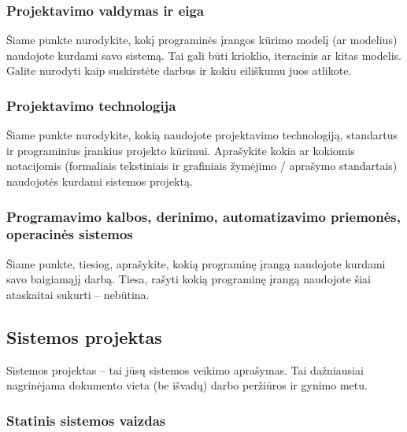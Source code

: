 \documentclass{ktuthesis}
\begin{document}
	\subsubsection{Projektavimo valdymas ir eiga}
	
	Šiame punkte nurodykite, kokį programinės įrangos kūrimo modelį (ar modelius) naudojote kurdami savo sistemą. Tai gali būti krioklio, iteracinis ar kitas modelis.
	Galite nurodyti kaip suskirstėte darbus ir kokiu eiliškumu juos atlikote.
	
	\subsubsection{Projektavimo technologija}
	
	Šiame punkte nurodykite, kokią naudojote projektavimo technologiją, standartus ir programinius įrankius projekto kūrimui. Aprašykite kokia ar kokiomis notacijomis
	(formaliais tekstiniais ir grafiniais žymėjimo / aprašymo standartais) naudojotės kurdami sistemos projektą.
	
	\subsubsection{Programavimo kalbos, derinimo, automatizavimo priemonės, operacinės sistemos}
	
	Šiame punkte, tiesiog, aprašykite, kokią programinę įrangą naudojote kurdami savo baigiamąjį darbą. Tiesa, rašyti kokią programinę įrangą naudojote šiai ataskaitai
	sukurti – nebūtina.
	
	\subsection{Sistemos projektas}
	
	Sistemos projektas – tai jūsų sistemos veikimo aprašymas. Tai dažniausiai nagrinėjama dokumento vieta (be išvadų) darbo peržiūros ir gynimo metu.
	
	\subsubsection{Statinis sistemos vaizdas}
	
\end{document}
